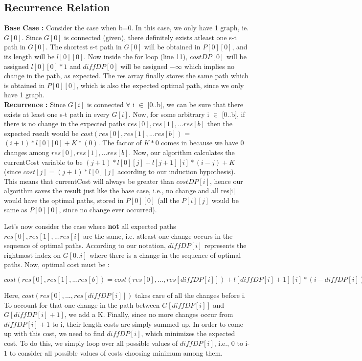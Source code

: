 \documentclass{article}
\begin{document}
\subsection{Recurrence Relation}
\textbf{Base Case : } Consider the case when b=0. In this case, we only have 1 graph, ie. $G[0]$. Since $G[0]$ is connected (given), there definitely exists atleast one s-t path in $G[0]$. The shortest s-t path in $G[0]$ will be obtained in $P[0][0]$, and its length will be $l[0][0]$. Now inside the for loop (line 11), $costDP[0]$ will be assigned $l[0][0]*1$ and $diffDP[0]$ will be assigned $-\infty$ which implies no change in the path, as expected. The res array finally stores the same path which is obtained in $P[0][0]$, which is also the expected optimal path, since we only have 1 graph.
\vspace{2mm}
\\
\textbf{Recurrence : } Since $G[i]$ is connected $\forall$ i $\in$ [0..b], we can be sure that there exists at least one s-t path in every $G[i]$. Now, for some arbitrary i $\in$ [0..b], if there is no change in the expected paths $res[0], res[1], ...res[b]$ then the expected result would be $cost(res[0], res[1], ...res[b])$ = $(i+1)*l[0][0] + K*(0)$. The factor of $K*0$ comes in because we have 0 changes among $res[0], res[1], ...res[b]$. Now, our algorithm calculates the currentCost variable to be $(j+1)*l[0][j] + l[j+1][i]*(i-j) + K$ (since $cost[j]=(j+1)*l[0][j]$ according to our induction hypothesis). This means that currentCost will always be greater than $costDP[i]$, hence our algorithm saves the result just like the base case, i.e., no change and all res[i] would have the optimal paths, stored in $P[0][0]$ (all the $P[i][j]$ would be same as $P[0][0]$, since no change ever occurred).
\par
Let's now consider the case where \textbf{not} all expected paths $res[0], res[1], ...res[i]$ are the same, i.e. atleast one change occurs in the sequence of optimal paths. According to our notation, $diffDP[i]$ represents the rightmost index on $G[0..i]$ where there is a change in the sequence of optimal paths. Now, optimal cost must be :
\begin{center}
$cost(res[0], res[1], ...res[b]) = cost(res[0],...,res[diffDP[i]])+l[diffDP[i]+1][i]*(i-diffDP[i])+K$
\end{center}
Here, $cost(res[0],...,res[diffDP[i]])$ takes care of all the changes before i. To account for that one change in the path between $G[diffDP[i]]$ and $G[diffDP[i]+1]$, we add a K. Finally, since no more changes occur from $diffDP[i]+1$ to i, their length costs are simply summed up. In order to come up with this cost, we need to find $diffDP[i]$, which minimizes the expected cost. To do this, we simply loop over all possible values of $diffDP[i]$, i.e., 0 to i-1 to consider all possible values of costs choosing minimum among them.
\end{document}
